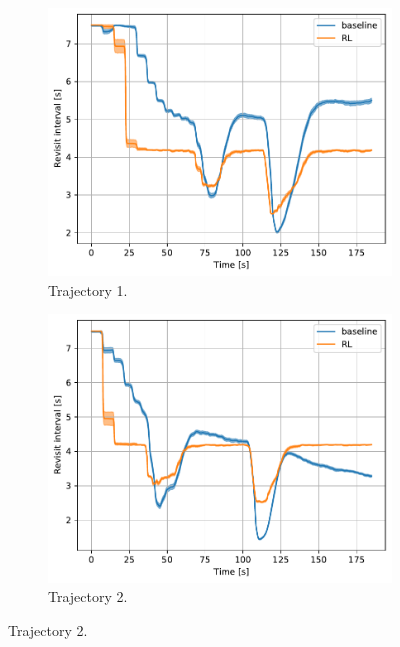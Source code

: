\documentclass[english, 12pt, a4paper, elec, utf8, a-1b, online]{aaltothesis}
\begin{document}
\begin{figure}[htb]
    \centering
    \begin{subfigure}[b]{0.45\textwidth}
        \centering
        \includegraphics[width=\linewidth]{figures/benchmark/Simulations/revisit_intervals_0.pdf}
        \caption{Trajectory 1.}
        \label{fig:TL_T1}
    \end{subfigure}
    \hfill
    \begin{subfigure}[b]{0.45\textwidth}
        \centering
        \includegraphics[width=\linewidth]{figures/benchmark/Simulations/revisit_intervals_1.pdf}
        \caption{Trajectory 2.}
        \label{fig:TL_T2}
    \end{subfigure}

\end{figure}
\end{document}
